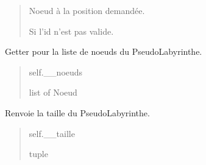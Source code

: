 \documentclass[letterpaper,10pt,french]{sphinxmanual}
\begin{document}
\begin{fulllineitems}
\begin{fulllineitems}
\begin{quote}
\begin{description}
\sphinxAtStartPar
Noeud à la position demandée.

\sphinxAtStartPar
{\hyperref[\detokenize{src:src.utilites.Noeud}]{}}

\sphinxAtStartPar
{} \textendash{} Si l’id n’est pas valide.

\end{description}\end{quote}

\end{fulllineitems}


\begin{fulllineitems}
\label{\detokenize{src:src.utilites.PseudoLabyrinthe.get_noeuds}}
\pysigstartsignatures
{}
\pysigstopsignatures
\sphinxAtStartPar
Getter pour la liste de noeuds du PseudoLabyrinthe.
\begin{quote}\begin{description}
\sphinxAtStartPar
self.\_\_noeuds

\sphinxAtStartPar
list of Noeud

\end{description}\end{quote}

\end{fulllineitems}


\begin{fulllineitems}
\label{\detokenize{src:src.utilites.PseudoLabyrinthe.get_taille}}
\pysigstartsignatures
{}
\pysigstopsignatures
\sphinxAtStartPar
Renvoie la taille du PseudoLabyrinthe.
\begin{quote}\begin{description}
\sphinxAtStartPar
self.\_\_taille

\sphinxAtStartPar
tuple

\end{description}\end{quote}


\end{fulllineitems}
\end{fulllineitems}
\end{document}
